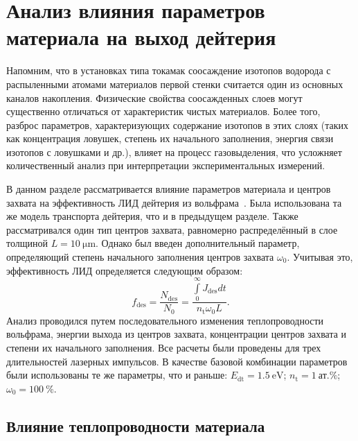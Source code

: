 \section{Анализ влияния параметров материала на выход дейтерия}\label{sec:ch4/seс3}
Напомним, что в установках типа токамак соосаждение изотопов водорода с распыленными атомами материалов первой стенки считается один из основных каналов накопления. Физические свойства соосажденных слоев могут существенно отличаться от характеристик чистых материалов. Более того, разброс параметров, характеризующих содержание изотопов в этих слоях (таких как концентрация ловушек, степень их начального заполнения, энергия связи изотопов с ловушками и др.), влияет на процесс газовыделения, что усложняет количественный анализ при интерпретации экспериментальных измерений.

В данном разделе рассматривается влияние параметров материала и центров захвата на эффективность ЛИД дейтерия из вольфрама~\cite{Kulagin2023}. Была использована та же модель транспорта дейтерия, что и в предыдущем разделе. Также рассматривался один тип центров захвата, равномерно распределённый в слое толщиной \( L=\SI{10}{\micro\meter}\). Однако был введен дополнительный параметр, определяющий степень начального заполнения центров захвата \(\omega_0 \). Учитывая это, эффективность ЛИД определяется следующим образом:
\begin{equation}
    f_\mathrm{des} = \dfrac{N_\mathrm{des}}{N_0}=\dfrac{\int\limits_0^\infty J_\mathrm{des}dt}{n_\mathrm{t}\omega_0 L}.
\end{equation}
Анализ проводился путем последовательного изменения теплопроводности вольфрама, энергии выхода из центров захвата, концентрации центров захвата и степени их начального заполнения. Все расчеты были проведены для трех длительностей лазерных импульсов. В качестве базовой комбинации параметров были использованы те же параметры, что и раньше: \(E_\mathrm{dt}=\SI{1.5}{\electronvolt} \); \( n_\mathrm{t}=\SI{1}{\text{ат.}\percent} \); \( \omega_0=\SI{100}{\percent} \).

\subsection{Влияние теплопроводности материала}\label{subsec:ch4/seс3/subsec1}


